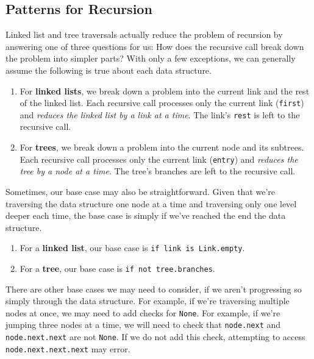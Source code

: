 \documentclass[a4paper]{book}
\begin{document}
\subsection{Patterns for Recursion}

Linked list and tree traversals actually reduce the problem of recursion by answering one of three questions for us: How does the recursive call break down the problem into simpler parts? With only a few exceptions, we can generally assume the following is true about each data structure.

\begin{enumerate}
\item For \textbf{linked lists}, we break down a problem into the current link and the rest of the linked list. Each recursive call processes only the current link ({\tt first}) and \textit{reduces the linked list by a link at a time}. The link's {\tt rest} is left to the recursive call.
\item For \textbf{trees}, we break down a problem into the current node and its subtrees. Each recursive call processes only the current link ({\tt entry}) and \textit{reduces the tree by a node at a time}. The tree's branches are left to the recursive call.
\end{enumerate}

Sometimes, our base case may also be straightforward. Given that we're traversing the data structure one node at a time and traversing only one level deeper each time, the base case is simply if we've reached the end the data structure.

\begin{enumerate}
\item For a \textbf{linked list}, our base case is {\tt if link is Link.empty}.
\item For a \textbf{tree}, our base case is {\tt if not tree.branches}.
\end{enumerate}

There are other base cases we may need to consider, if we aren't progressing so simply through the data structure. For example, if we're traversing multiple nodes at once, we may need to add checks for {\tt None}. For example, if we're jumping three nodes at a time, we will need to check that {\tt node.next} and {\tt node.next.next} are not {\tt None}. If we do not add this check, attempting to access {\tt node.next.next.next} may error.

\vfill

\pagebreak \newpage
\end{document}
